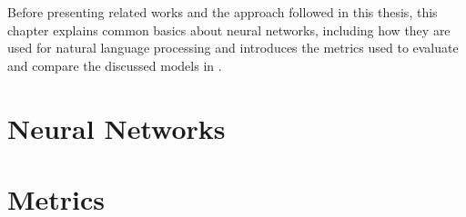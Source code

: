Before presenting related works and the approach followed in this thesis, this chapter explains common basics about neural networks, including how they are used for natural language processing and introduces the metrics used to evaluate and compare the discussed models in .


\section{Neural Networks}
\label{sec:2_basics/1_neural_networks}



\section{Metrics}
\label{sec:2_basics/2_metrics}

